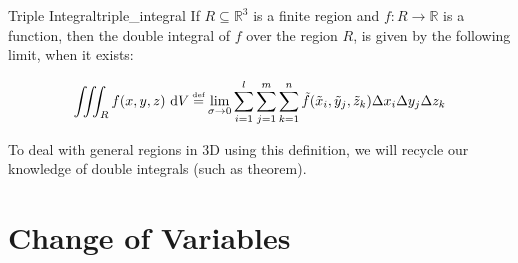 \begin{adefinition}{Triple Integral}{triple_integral}
    If $R \subseteq \mathbb{R}^3$ is a finite region and $f: R \rightarrow \mathbb{R}$ is a function, then the double integral of $f$ over the region $R$, is given by the following limit, when it exists:
    
    \begin{equation*}
        \iiint_R f(x,y,z) \ \mathrm{d} V \defeq \lim_{\sigma \rightarrow 0} \sum_{i=1}^{l} \sum_{j=1}^{m} \sum_{k=1}^{n} \tilde{f}(\tilde{x}_i, \tilde{y}_j, \tilde{z}_k)\Delta x_i \Delta y_j \Delta z_k
    \end{equation*}
\end{adefinition}

To deal with general regions in $3\text{D}$ using this definition, we will recycle our knowledge of double integrals (such as  theorem). 



\section{Change of Variables}
\label{sec:change_of_var}

